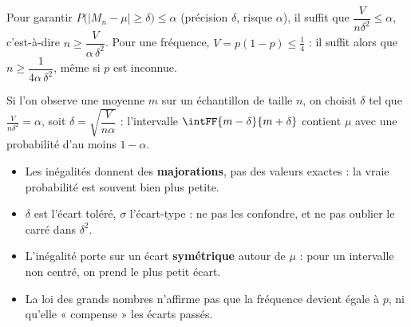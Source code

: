 
\begin{savoirfaire}
Pour garantir $P\big(|M_n-\mu|\geq\delta\big)\leq\alpha$ (précision $\delta$, risque $\alpha$), il suffit que $\dfrac{V}{n\delta^{2}}\leq\alpha$,
c'est-à-dire $n\geq\dfrac{V}{\alpha\,\delta^{2}}$. Pour une fréquence, $V=p(1-p)\leq\frac14$ : il suffit alors que $n\geq\dfrac{1}{4\alpha\,\delta^{2}}$,
même si $p$ est inconnue.
\end{savoirfaire}

\begin{savoirfaire}
Si l'on observe une moyenne $m$ sur un échantillon de taille $n$, on choisit $\delta$ tel que $\frac{V}{n\delta^{2}}=\alpha$, soit
$\delta=\sqrt{\dfrac{V}{n\alpha}}$ : l'intervalle $\intFF{m-\delta}{m+\delta}$ contient $\mu$ avec une probabilité d'au moins $1-\alpha$.
\end{savoirfaire}

\begin{attention}
\begin{itemize}[label={\color{otOrange}\textbullet},leftmargin=1.4em,itemsep=0.6mm,topsep=0.5mm]
  \item Les inégalités donnent des \textbf{majorations}, pas des valeurs exactes : la vraie probabilité est souvent bien plus petite.
  \item $\delta$ est l'écart toléré, $\sigma$ l'écart-type : ne pas les confondre, et ne pas oublier le carré dans $\delta^{2}$.
  \item L'inégalité porte sur un écart \textbf{symétrique} autour de $\mu$ : pour un intervalle non centré, on prend le plus petit écart.
  \item La loi des grands nombres n'affirme pas que la fréquence devient égale à $p$, ni qu'elle « compense » les écarts passés.
\end{itemize}
\end{attention}

\exercices
{}

